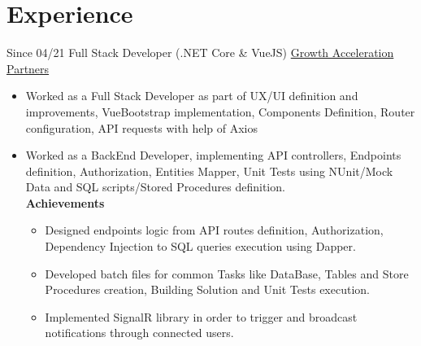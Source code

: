 \documentclass[letterpaper]{twentysecondcv} %
\begin{document}
\section{Experience}
    \begin{twenty}
        \twentyitem
        {Since 04/21}
        {Full Stack Developer (.NET Core \& VueJS)}
        { \href{https://www.growthaccelerationpartners.com/}{Growth Acceleration Partners}}
        {
            \begin{itemize}
                \item Worked as a Full Stack Developer as part of UX/UI definition and improvements, VueBootstrap implementation, Components Definition, Router configuration, API requests with help of Axios
                
                \item Worked as a BackEnd Developer, implementing API controllers, Endpoints definition, Authorization, Entities Mapper, Unit Tests using NUnit/Mock Data and SQL scripts/Stored Procedures definition.\\
                
                \textbf{Achievements}
                \begin{itemize}

                    
                    \item Designed endpoints logic from API routes definition, Authorization, Dependency Injection to SQL queries execution using Dapper.
                    
                    
                    \item Developed batch files for common Tasks like DataBase, Tables and Store Procedures creation, Building Solution and Unit Tests execution.
                    
                    \item Implemented SignalR library in order to trigger and broadcast notifications through connected users.
                    
                    

\end{itemize}
\end{itemize}}
\end{twenty}
\end{document}

